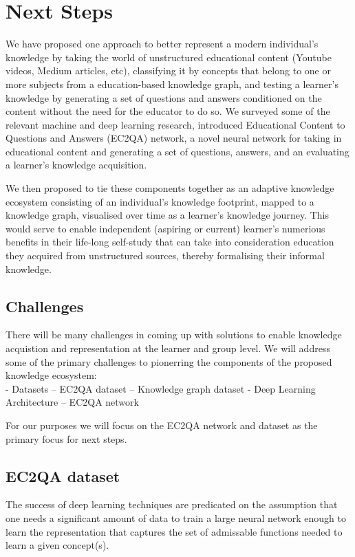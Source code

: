 \documentclass[]{book}
\theoremstyle{definition}
\theoremstyle{definition}
\theoremstyle{definition}
\theoremstyle{remark}
\begin{document}
\chapter{Next Steps}\label{next-steps}

We have proposed one approach to better represent a modern individual's
knowledge by taking the world of unstructured educational content
(Youtube videos, Medium articles, etc), classifying it by concepts that
belong to one or more subjects from a education-based knowledge graph,
and testing a learner's knowledge by generating a set of questions and
answers conditioned on the content without the need for the educator to
do so. We surveyed some of the relevant machine and deep learning
research, introduced Educational Content to Questions and Answers
(EC2QA) network, a novel neural network for taking in educational
content and generating a set of questions, answers, and an evaluating a
learner's knowledge acquisition.

We then proposed to tie these components together as an adaptive
knowledge ecosystem consisting of an individual's knowledge footprint,
mapped to a knowledge graph, visualised over time as a learner's
knowledge journey. This would serve to enable independent (aspiring or
current) learner's numerious benefits in their life-long self-study that
can take into consideration education they acquired from unstructured
sources, thereby formalising their informal knowledge.

\section{Challenges}\label{challenges}

There will be many challenges in coming up with solutions to enable
knowledge acquistion and representation at the learner and group level.
We will address some of the primary challenges to pionerring the
components of the proposed knowledge ecosystem:\\
- Datasets -- EC2QA dataset -- Knowledge graph dataset - Deep Learning
Architecture -- EC2QA network

For our purposes we will focus on the EC2QA network and dataset as the
primary focus for next steps.

\section{EC2QA dataset}\label{ec2qa-dataset}

The success of deep learning techniques are predicated on the assumption
that one needs a significant amount of data to train a large neural
network enough to learn the representation that captures the set of
admissable functions needed to learn a given concept(s).
\end{document}
